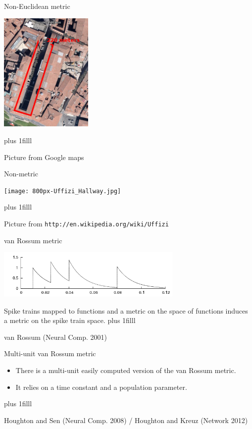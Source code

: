 \documentclass{beamer}
\newcommand{\btVFill}{\vskip0pt plus 1filll}
\begin{document}
\begin{frame}{Non-Euclidean metric}
\begin{center}
\includegraphics[width=4.5cm]{U2.png}
\end{center}
\btVFill
\begin{flushright}
\tiny{Picture from Google maps}
\end{flushright}
\end{frame}


\begin{frame}{Non-metric}
\begin{center}
\texttt{[image: 800px-Uffizi\_Hallway.jpg]}
\end{center}
\btVFill
\begin{flushright}
\tiny{Picture from \texttt{http://en.wikipedia.org/wiki/Uffizi}}
\end{flushright}
\end{frame}


\begin{frame}{van Rossum metric}
\begin{center}
\includegraphics[width=9cm]{filtered.png}
\end{center}
Spike trains mapped to functions and a metric on the space of functions induces a metric on the spike train space.
\btVFill
\begin{flushright}
\tiny{van Rossum (Neural Comp. 2001)}
\end{flushright}
\end{frame}


\begin{frame}{Multi-unit van Rossum metric}
\begin{itemize}
\item There is a multi-unit easily computed version of the van Rossum metric.
\item It relies on a time constant and a population parameter.
\end{itemize}
\btVFill
\begin{flushright}
\tiny{Houghton and Sen (Neural Comp. 2008) / Houghton and Kreuz (Network 2012)}
\end{flushright}
\end{frame}
\end{document}
